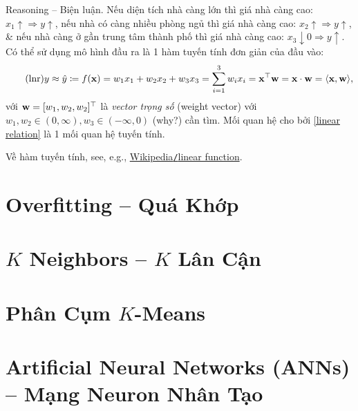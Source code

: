 \documentclass{article}
\begin{document}
{\sf Reasoning -- Biện luận.} Nếu diện tích nhà càng lớn thì giá nhà càng cao: $x_1\uparrow\Rightarrow y\uparrow$, nếu nhà có càng nhiều phòng ngủ thì giá nhà càng cao: $x_2\uparrow\Rightarrow y\uparrow$, \& nếu nhà càng ở gần trung tâm thành phố thì giá nhà càng cao: $x_3\downarrow0\Rightarrow y\uparrow$. Có thể sử dụng mô hình đầu ra là 1 hàm tuyến tính đơn giản của đầu vào:
\begin{equation}
	\label{linear relation}
	\tag{lnr}
	y\approx\hat{y}\coloneqq f({\bf x}) = w_1x_1 + w_2x_2 + w_3x_3 = \sum_{i=1}^3 w_ix_i = {\bf x}^\top{\bf w} = {\bf x}\cdot{\bf w} = \langle{\bf x},{\bf w}\rangle,
\end{equation}
với ${\bf w} = [w_1,w_2,w_2]^\top$ là {\it vector trọng số} (weight vector) với $w_1,w_2\in(0,\infty),w_3\in(-\infty,0)$ (why?) cần tìm. Mối quan hệ cho bởi \eqref{linear relation} là 1 mối quan hệ tuyến tính.

Về hàm tuyến tính, see, e.g., \href{https://en.wikipedia.org/wiki/Linear_function}{Wikipedia{\tt/}linear function}.


\section{Overfitting -- Quá Khớp}


\section{$K$ Neighbors -- $K$ Lân Cận}


\section{Phân Cụm $K$-Means}


\section{Artificial Neural Networks (ANNs) -- Mạng Neuron Nhân Tạo}

\end{document}

